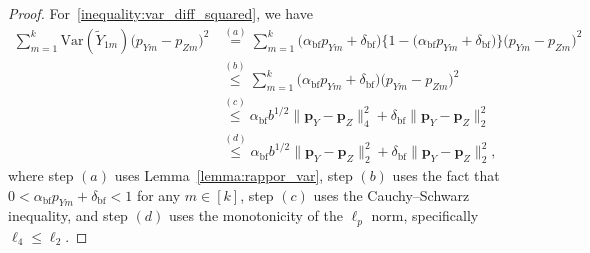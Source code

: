 \documentclass[twoside,11pt]{article}
\newcommand{\rvTwo}{Y}
\newcommand{\rvThree}{Z}
\newcommand{\private}[1]{\tilde{#1}}
\newcommand{\normSqMultinomMax}{b}
\newcommand{\alphabetSize}{k} %
\newcommand{\vectorIndex}{m}
\newcommand{\probVecElement}[2]{p_{{#1}{#2}}}
\newcommand{\probVec}{\mathbf{p}} %
\newcommand{\privacyParameter}{\alpha} %
\newcommand{\privacyParameterrappor}{\privacyParameter_{\mathrm{bf}}}
\newcommand{\smallNumber}{\delta}
\newcommand{\smallNumberrappor}{\smallNumber_{\mathrm{bf}}}
\begin{document}
\begin{appendix}
\begin{proof}
		
		For~\eqref{inequality:var_diff_squared}, we have 
		\begin{align*}
			\sum_{\vectorIndex=1}^\alphabetSize
			\mathrm{Var}
			( %
			\private{\rvTwo}_{1 \vectorIndex}
			) %
			\bigl( %
			\probVecElement{\rvTwo}{\vectorIndex}
			- %
			\probVecElement{\rvThree}{\vectorIndex}
			\bigr)^2
			&\stackrel{(a)}{=}%
			\sum_{\vectorIndex=1}^\alphabetSize
			\bigl(
			\privacyParameterrappor 
			\probVecElement{\rvTwo}{\vectorIndex}
			+ \smallNumberrappor
			\bigr)
			\bigl\{
			1
			-
			\bigl(
			\privacyParameterrappor 
			\probVecElement{\rvTwo}{\vectorIndex}
			+ \smallNumberrappor
			\bigr)
			\bigr\}
			\bigl( %
			\probVecElement{\rvTwo}{\vectorIndex}
			- %
			\probVecElement{\rvThree}{\vectorIndex}
			\bigr)^2 %
			\\&\stackrel{(b)}{\leq}%
			\sum_{\vectorIndex=1}^\alphabetSize
			\bigl(
			\privacyParameterrappor 
			\probVecElement{\rvTwo}{\vectorIndex}
			+ \smallNumberrappor
			\bigr)
			\bigl( %
			\probVecElement{\rvTwo}{\vectorIndex}
			- %
			\probVecElement{\rvThree}{\vectorIndex}
			\bigr)^2 %
			\\&\stackrel{(c)}{\leq}%
			\privacyParameterrappor
			\normSqMultinomMax^{1/2}
			\|\probVec_{\rvTwo} - \probVec_{\rvThree}\|_4^2
			+
			\smallNumberrappor
			\|\probVec_{\rvTwo} - \probVec_{\rvThree}\|_2^2
			\\&\stackrel{(d)}{\leq}%
			\privacyParameterrappor
			\normSqMultinomMax^{1/2}
			\|\probVec_{\rvTwo} - \probVec_{\rvThree}\|_2^2
			+
			\smallNumberrappor
			\|\probVec_{\rvTwo} - \probVec_{\rvThree}\|_2^2,
		\end{align*}
		where step $(a)$ uses Lemma~\ref{lemma:rappor_var},
		step $(b)$ uses the fact that
		\( 0 < \privacyParameterrappor \probVecElement{\rvTwo}{\vectorIndex} + \smallNumberrappor < 1 \) for any $\vectorIndex \in [\alphabetSize]$,
		step $(c)$ uses the Cauchy--Schwarz inequality,
		and step $(d)$ uses the monotonicity of the $\ell_p$ norm, specifically $\ell_4 \leq \ell_2$.
		

\end{proof}
\end{appendix}
\end{document}
